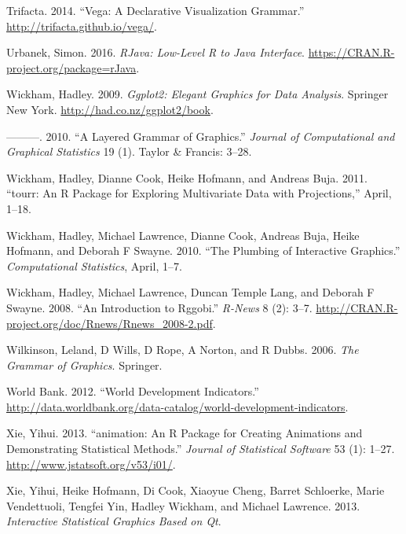 \documentclass[12pt,]{article}
\theoremstyle{definition}
\theoremstyle{definition}
\theoremstyle{remark}
\begin{document}
\hypertarget{ref-vega}{}
Trifacta. 2014. ``Vega: A Declarative Visualization Grammar.''
\url{http://trifacta.github.io/vega/}.

\hypertarget{ref-rJava}{}
Urbanek, Simon. 2016. \emph{RJava: Low-Level R to Java Interface}.
\url{https://CRAN.R-project.org/package=rJava}.

\hypertarget{ref-ggplot2-book}{}
Wickham, Hadley. 2009. \emph{Ggplot2: Elegant Graphics for Data
Analysis}. Springer New York. \url{http://had.co.nz/ggplot2/book}.

\hypertarget{ref-ggplot2-paper}{}
---------. 2010. ``A Layered Grammar of Graphics.'' \emph{Journal of
Computational and Graphical Statistics} 19 (1). Taylor \& Francis:
3--28.

\hypertarget{ref-tourr}{}
Wickham, Hadley, Dianne Cook, Heike Hofmann, and Andreas Buja. 2011.
``tourr: An R Package for Exploring Multivariate Data with
Projections,'' April, 1--18.

\hypertarget{ref-plumbing}{}
Wickham, Hadley, Michael Lawrence, Dianne Cook, Andreas Buja, Heike
Hofmann, and Deborah F Swayne. 2010. ``The Plumbing of Interactive
Graphics.'' \emph{Computational Statistics}, April, 1--7.

\hypertarget{ref-rggobi}{}
Wickham, Hadley, Michael Lawrence, Duncan Temple Lang, and Deborah F
Swayne. 2008. ``An Introduction to Rggobi.'' \emph{R-News} 8 (2): 3--7.
\url{http://CRAN.R-project.org/doc/Rnews/Rnews_2008-2.pdf}.

\hypertarget{ref-wilkinson}{}
Wilkinson, Leland, D Wills, D Rope, A Norton, and R Dubbs. 2006.
\emph{The Grammar of Graphics}. Springer.

\hypertarget{ref-WorldBank}{}
World Bank. 2012. ``World Development Indicators.''
\url{http://data.worldbank.org/data-catalog/world-development-indicators}.

\hypertarget{ref-animation}{}
Xie, Yihui. 2013. ``animation: An R Package for Creating Animations and
Demonstrating Statistical Methods.'' \emph{Journal of Statistical
Software} 53 (1): 1--27. \url{http://www.jstatsoft.org/v53/i01/}.

\hypertarget{ref-cranvas}{}
Xie, Yihui, Heike Hofmann, Di Cook, Xiaoyue Cheng, Barret Schloerke,
Marie Vendettuoli, Tengfei Yin, Hadley Wickham, and Michael Lawrence.
2013. \emph{Interactive Statistical Graphics Based on Qt}.
\end{document}
